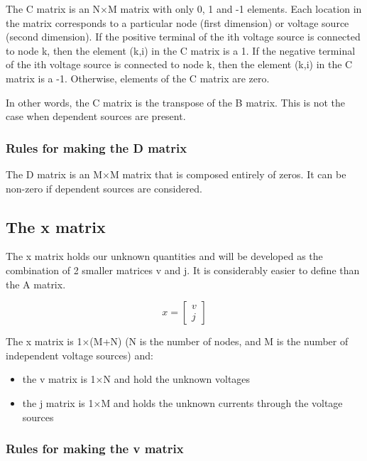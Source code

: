 The C matrix is an N$\times$M matrix with only 0, 1 and -1 elements.
Each location in the matrix corresponds to a particular node (first
dimension) or voltage source (second dimension).  If the positive
terminal of the ith voltage source is connected to node k, then the
element (k,i) in the C matrix is a 1.  If the negative terminal of the
ith voltage source is connected to node k, then the element (k,i) in
the C matrix is a -1.  Otherwise, elements of the C matrix are zero.

\addvspace{12pt}

In other words, the C matrix is the transpose of the B matrix.  This
is not the case when dependent sources are present.

\subsubsection{Rules for making the D matrix}

The D matrix is an M$\times$M matrix that is composed entirely of
zeros.  It can be non-zero if dependent sources are considered.

\subsection{The x matrix}

The x matrix holds our unknown quantities and will be developed as the
combination of 2 smaller matrices v and j.  It is considerably easier
to define than the A matrix.

\begin{equation}
x =
\begin{bmatrix}
v\\
j
\end{bmatrix}
\end{equation}

The x matrix is 1$\times$(M+N) (N is the number of nodes, and M is the
number of independent voltage sources) and:

\begin{itemize}
\item
the v matrix is 1$\times$N and hold the unknown voltages
\item
the j matrix is 1$\times$M and holds the unknown currents through the
voltage sources
\end{itemize}

\subsubsection{Rules for making the v matrix}

